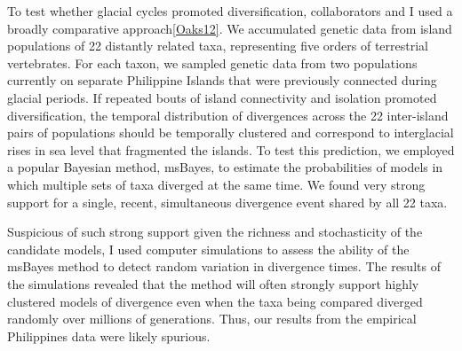 
To test whether glacial cycles promoted diversification,
collaborators and I used a broadly comparative approach\cref{Oaks12}.
We accumulated genetic data from island populations of 22 distantly related
taxa, representing five orders of terrestrial vertebrates.
For each taxon, we sampled genetic data from two populations currently on
separate Philippine Islands that were previously connected during glacial
periods.
If repeated bouts of island connectivity and isolation promoted
diversification, the temporal distribution of divergences across the 22
inter-island pairs of populations should be temporally clustered and correspond
to interglacial rises in sea level that fragmented the islands.
To test this prediction, we employed a popular Bayesian method,
msBayes, to estimate the probabilities of models in which multiple sets of taxa
diverged at the same time.
We found very strong support
for a single, recent, simultaneous divergence event shared by all 22 taxa.

Suspicious of such strong support given the richness and stochasticity of the
candidate models,
I used computer simulations to assess the ability of the msBayes method to
detect random variation in divergence times.
The results of the simulations revealed that the method will often strongly
support highly clustered models of divergence even when the taxa being compared
diverged randomly over millions of generations.
Thus, our results from the empirical Philippines data were likely spurious.

